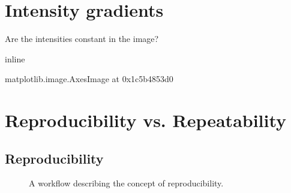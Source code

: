 \documentclass[letterpaper,10pt,english]{sphinxmanual}
\begin{document}
\noindent{}


\section{Intensity gradients}
\label{\detokenize{01-Introduction:intensity-gradients}}
\sphinxAtStartPar
Are the intensities constant in the image?

\begin{sphinxVerbatim}[commandchars=\\\{\}]
 inline
   
   
   
    

       
         
\end{sphinxVerbatim}

\begin{sphinxVerbatim}[commandchars=\\\{\}]
\PYGZlt{}matplotlib.image.AxesImage at 0x1c5b4853d0\PYGZgt{}
\end{sphinxVerbatim}

\noindent{}


\section{Reproducibility vs. Repeatability}
\label{\detokenize{01-Introduction:reproducibility-vs-repeatability}}

\subsection{Reproducibility}
\label{\detokenize{01-Introduction:reproducibility}}
\begin{figure}[htbp]
\centering
\capstart

\noindent{}
\caption{A workflow describing the concept of reproducibility.}\label{\detokenize{01-Introduction:id10}}\end{figure}
\end{document}

